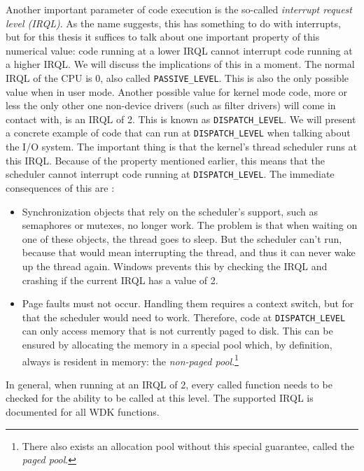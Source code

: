 Another important parameter of code execution is the so-called \emph{interrupt request level (IRQL)}. As the name suggests, this has something to do with interrupts, but for this thesis it suffices to talk about one important property of this numerical value: code running at a lower IRQL cannot interrupt code running at a higher IRQL. We will discuss the implications of this in a moment. The normal IRQL of the CPU is 0, also called \texttt{PASSIVE\_LEVEL}. This is also the only possible value when in user mode. Another possible value for kernel mode code, more or less the only other one non-device drivers (such as filter drivers) will come in contact with, is an IRQL of 2. This is known as \texttt{DISPATCH\_LEVEL}. We will present a concrete example of code that can run at \texttt{DISPATCH\_LEVEL} when talking about the I/O system. The important thing is that the kernel's thread scheduler runs at this IRQL. Because of the property mentioned earlier, this means that the scheduler cannot interrupt code running at \texttt{DISPATCH\_LEVEL}. The immediate consequences of this are \cite{Yosifovich2017}:
\begin{itemize}
	\item Synchronization objects that rely on the scheduler's support, such as semaphores or mutexes, no longer work. The problem is that when waiting on one of these objects, the thread goes to sleep. But the scheduler can't run, because that would mean interrupting the thread, and thus it can never wake up the thread again. Windows prevents this by checking the IRQL and crashing if the current IRQL has a value of 2.
	\item Page faults must not occur. Handling them requires a context switch, but for that the scheduler would need to work. Therefore, code at \texttt{DISPATCH\_LEVEL} can only access memory that is not currently paged to disk. This can be ensured by allocating the memory in a special pool which, by definition, always is resident in memory: the \emph{non-paged pool}.\footnote{\label{fn:background.kerneldriver.pagedpool} There also exists an allocation pool without this special guarantee, called the \emph{paged pool}.}
\end{itemize}
In general, when running at an IRQL of 2, every called function needs to be checked for the ability to be called at this level. The supported IRQL is documented for all WDK functions.

